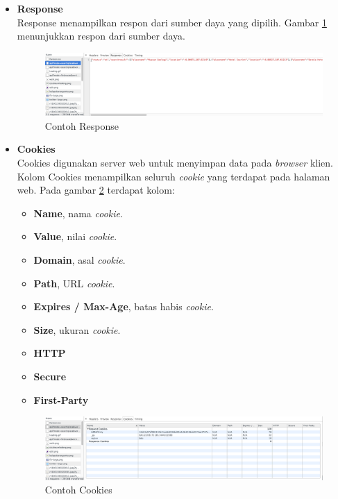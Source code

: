 \documentclass[a4paper,twoside]{article}
\begin{document}
\begin{itemize}
	\item \textbf{Response}\\
			Response menampilkan respon dari sumber daya yang dipilih. Gambar \ref{fig:2_devtools_network_response} menunjukkan respon dari sumber daya.
			
			\begin{figure}[H]
				\centering
				\includegraphics[scale=0.3]{Gambar/devtools-network-response}
				\caption{Contoh Response} 
				\label{fig:2_devtools_network_response}
			\end{figure}
			
	\item \textbf{Cookies}\\
			Cookies digunakan server web untuk menyimpan data pada \textit{browser} klien.  Kolom Cookies menampilkan seluruh \textit{cookie} yang terdapat pada halaman web. Pada gambar \ref{fig:2_devtools_network_cookies} terdapat kolom:
			\begin{itemize}
				\item \textbf{Name}, nama \textit{cookie}.
				\item \textbf{Value}, nilai \textit{cookie}.
				\item \textbf{Domain}, asal \textit{cookie}.
				\item \textbf{Path}, URL \textit{cookie}.
				\item \textbf{Expires / Max-Age}, batas habis \textit{cookie}.
				\item \textbf{Size}, ukuran \textit{cookie}.
				\item \textbf{HTTP}
				\item \textbf{Secure}
				\item \textbf{First-Party}
			\end{itemize}					 
			
			\begin{figure}[H]
				\centering
				\includegraphics[scale=0.3]{Gambar/devtools-network-cookies}
				\caption{Contoh Cookies} 
				\label{fig:2_devtools_network_cookies}
			\end{figure}
\end{itemize}
\end{document}
